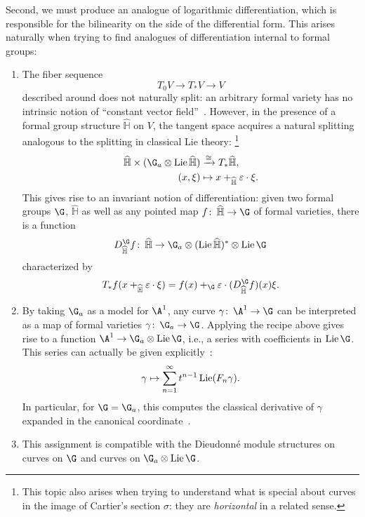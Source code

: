 Second, we must produce an analogue of logarithmic differentiation, which is responsible for the bilinearity on the side of the differential form.
This arises naturally when trying to find analogues of differentiation internal to formal groups:
\begin{enumerate}
    \item The fiber sequence \[T_0 V \to T_* V \to V\] described around  does not naturally split: an arbitrary formal variety has no intrinsic notion of ``constant vector field''~\cite[V.11.12]{LazardCFGs}.
          However, in the presence of a formal group structure \(\widehat{\mathbb H}\) on \(V\), the tangent space acquires a natural splitting analogous to the splitting in classical Lie theory:%
\footnote{%
          This topic also arises when trying to understand what is special about curves in the image of Cartier's section \(\sigma\): they are \emph{horizontal} in a related sense.
}
          \begin{align*}
          \widehat{\mathbb H} \times (\G_a \otimes \Lie \widehat{\mathbb H}) & \xrightarrow{\cong} T_* \widehat{\mathbb H}, \\
          (x, \xi) & \mapsto x +_{\widehat{\mathbb H}} \eps \cdot \xi.
          \end{align*}
          This gives rise to an invariant notion of differentiation: given two formal groups \(\G\), \(\widehat{\mathbb H}\) as well as any pointed map \(f\co \widehat{\mathbb H} \to \G\) of formal varieties, there is a function \[D_{\widehat{\mathbb H}}^{\G} f\co \widehat{\mathbb H} \to \G_a \otimes (\Lie \widehat{\mathbb H})^* \otimes \Lie \G\] characterized by \[T_* f(x +_{\widehat{\mathbb H}} \eps \cdot \xi) = f(x) +_{\G} \eps \cdot (D^{\G}_{\widehat{\mathbb H}} f)(x) \xi.\]
    \item By taking \(\G_a\) as a model for \(\A^1\), any curve \(\gamma\co \A^1 \to \G\) can be interpreted as a map of formal varieties \(\gamma\co \G_a \to \G\).
          Applying the recipe above gives rise to a function \(\A^1 \to \G_a \otimes \Lie \G\), i.e., a series with coefficients in \(\Lie \G\).
          This series can actually be given explicitly~\cite[V.7.3]{LazardCFGs}: \[\gamma \mapsto \sum_{n=1}^\infty t^{n-1} \operatorname{Lie}(F_n \gamma).\]
          In particular, for \(\G = \G_a\), this computes the classical derivative of \(\gamma\) expanded in the canonical coordinate~\cite[V.7.13]{LazardCFGs}.
    \item This assignment is compatible with the Dieudonn\'e module structures on curves on \(\G\) and curves on \(\G_a \otimes \Lie \G\).

\end{enumerate}
